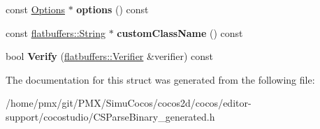 \begin{DoxyCompactItemize}
\item 
\mbox{\label{structflatbuffers_1_1NodeTree_a0b0963664da12030a3876c50be6df9c3}} 
const \hyperlink{structflatbuffers_1_1Options}{Options} $\ast$ {\bfseries options} () const
\item 
\mbox{\label{structflatbuffers_1_1NodeTree_ab4e63b6319d2f792dda015482805cdbc}} 
const \hyperlink{structflatbuffers_1_1String}{flatbuffers\+::\+String} $\ast$ {\bfseries custom\+Class\+Name} () const
\item 
\mbox{\label{structflatbuffers_1_1NodeTree_a95fa31f848f6988171eb28c837140d8d}} 
bool {\bfseries Verify} (\hyperlink{classflatbuffers_1_1Verifier}{flatbuffers\+::\+Verifier} \&verifier) const
\end{DoxyCompactItemize}


The documentation for this struct was generated from the following file\+:\begin{DoxyCompactItemize}
\item 
/home/pmx/git/\+P\+M\+X/\+Simu\+Cocos/cocos2d/cocos/editor-\/support/cocostudio/C\+S\+Parse\+Binary\+\_\+generated.\+h\end{DoxyCompactItemize}
